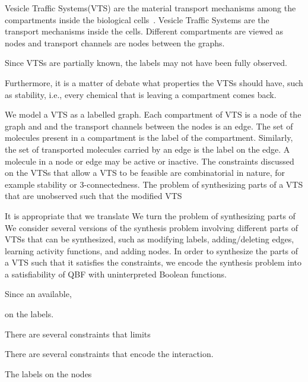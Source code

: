 Vesicle Traffic Systems(VTS) are the material transport mechanisms
among the compartments inside the biological cells~\cite{vtsIntro}.
%
%
Vesicle Traffic Systems are the transport mechanisms inside the cells.
%
Different compartments are viewed as nodes and transport channels are
nodes between the graphs.

Since VTSs are partially known, 
%
the labels may not have been fully observed.


Furthermore, it is a matter of debate what properties the VTSs should
have, such as stability, i.e., every chemical that is leaving a
compartment comes back.



We model a VTS as a labelled graph.
%
Each compartment of VTS is a node of the graph and and the
transport channels between the nodes is an edge.
%
The set of molecules present in a compartment is the label of
the compartment.
% 
Similarly, the set of transported molecules carried by an edge is the label
on the edge.
%
A molecule in a node or edge may be active or inactive. 
%
The constraints discussed on the VTSs that allow a VTS to be feasible
are combinatorial in nature, for example stability or 3-connectedness.
%
The problem of synthesizing parts of a VTS that are unobserved such that 
the modified VTS 

It is appropriate that we translate 
We turn the problem of synthesizing parts of 
%
We consider several versions of the synthesis problem involving different
parts of VTSs that can be synthesized, such as modifying labels,
adding/deleting edges, learning activity functions, and adding nodes.
%
In order to synthesize the parts of a VTS such that it satisfies the constraints, 
we encode the synthesis problem into a satisfiability of QBF with uninterpreted
Boolean functions. 




Since an available, 

on the labels.


There are several constraints that limits 

There are several constraints that encode the interaction.


The labels on the nodes 



